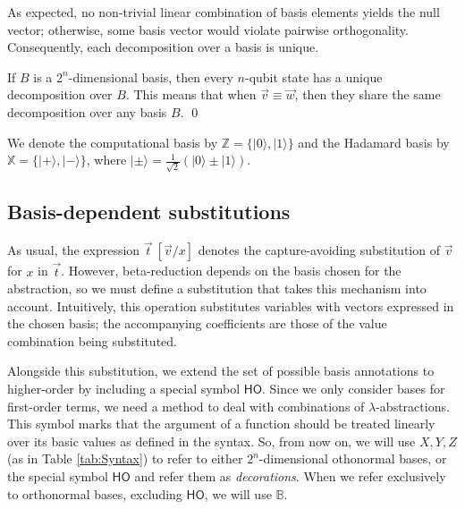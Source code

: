 \documentclass[a4paper,UKenglish,numberwithinsect,pdfa,anonymous]{lipics-v2021}
\theoremstyle{restatestyle}
\newcommand\ket[1]{\ensuremath{|#1\rangle}}
\newcommand\AbsBasis{\ensuremath{\mathsf{H\!O}}}
\def\BB{\mathbb{B}}
\newcommand\B{\mathbb Z}
\newcommand\XB{\mathbb X}
\begin{document}

As expected, no non-trivial linear combination of basis elements yields the null vector;
otherwise, some basis vector would violate pairwise orthogonality. Consequently, each
decomposition over a basis is unique.

\begin{remark}\label{rem:UniqueDecomposition}\label{cor:EquivalentDecomposition}
  If $B$ is a $2^n$-dimensional basis, then every $n$-qubit state has a
  unique decomposition over $B$. This means that when $\vec{v} \equiv \vec{w}$,
  then they share the same decomposition over any basis $B$.
  \qed
\end{remark}

We denote the computational basis by $\B=\{\ket{0},\ket{1}\}$ and the Hadamard
basis by $\XB=\{\ket{+},\ket{-}\}$, where
$\ket{\pm}=\tfrac{1}{\sqrt{2}}(\ket{0}\pm\ket{1})$.  

\subsection{Basis-dependent substitutions}
As usual, the expression $\vec t\ [\vec v/x]$ denotes the
capture-avoiding substitution of $\vec v$ for $x$ in $\vec t$.
However, beta-reduction depends on the basis chosen for the abstraction, so we must
define a substitution that takes this mechanism into account. Intuitively, this
operation substitutes variables with vectors expressed in the chosen basis; the
accompanying coefficients are those of the value combination being
substituted.

Alongside this substitution, we extend the set of possible basis annotations to
higher-order by including a special symbol \AbsBasis. Since we only consider bases
for first-order terms, we need a method to deal with combinations of 
$\lambda$-abstractions. This symbol marks that the argument of a function should be
treated linearly over its basic values as defined in the syntax. So, from now on, 
we will use $X, Y, Z$ (as in Table \ref{tab:Syntax}) to refer to either
$2^n$-dimensional othonormal bases, or the special symbol $\AbsBasis$ and
refer them as \emph{decorations}. When we refer exclusively to orthonormal bases,
excluding $\AbsBasis$, we will use $\BB$.
\end{document}
